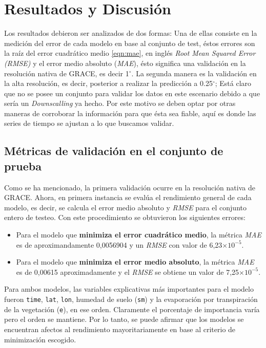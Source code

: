 \chapter{Resultados y Discusión}
\label{C4}
Los resultados debieron ser analizados de dos formas: Una de ellas consiste en la medición del error de cada modelo en base al conjunto de test, éstos errores son la 
raíz del error cuadrático medio \ref{eqn:mae}, en inglés \textit{Root Mean Squared Error (RMSE)} y el error medio absoluto (\textit{MAE}), ésto significa una validación en la resolución nativa de 
GRACE, es decir 1$^\circ$. La segunda manera es la validación en la alta resolución, es decir, posterior a realizar la predicción a 0.25$^\circ$; Está claro que no se posee
un conjunto para validar los datos en este escenario debido a que sería un \textit{Downscalling} ya hecho. Por este motivo se deben optar por otras maneras de corroborar la información
para que ésta sea fiable, aquí es donde las series de tiempo se ajustan a lo que buscamos validar.

\section{Métricas de validación en el conjunto de prueba }
Como se ha mencionado, la primera validación ocurre en la resolución nativa de GRACE. Ahora, en primera instancia se evalúa el rendimiento general de cada modelo, es decir, 
se calcula el error medio absoluto y \textit{RMSE} para el conjunto entero de testeo. Con este procedimiento se obtuvieron los siguientes errores:

\begin{itemize}
    \item Para el modelo que \textbf{minimiza el error cuadrático medio}, la métrica \textit{MAE} es de aproximandamente 0,0056904 y un \textit{RMSE} con valor de 6,23$ \times 10^{-5}$.
    \item Para el modelo que \textbf{minimiza el error medio absoluto}, la métrica \textit{MAE} es de 0,00615 aproximadamente y el \textit{RMSE} se obtiene un valor de 7,25$ \times 10^{-5}$.
\end{itemize}

Para ambos modelos, las variables explicativas más importantes para el modelo fueron \texttt{time}, \texttt{lat}, \texttt{lon}, humedad de suelo (\texttt{sm}) y la evaporación por transpiración de la vegetación (\texttt{e}), en ese orden. Claramente el porcentaje de importancia
varía pero el orden se mantiene. Por lo tanto, se puede afirmar que los modelos se encuentran afectos al rendimiento mayoritariamente en base al criterio de minimización escogido.

